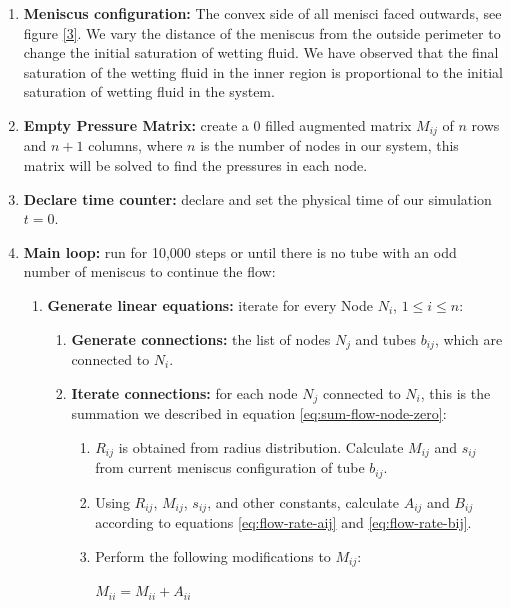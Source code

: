 \documentclass[
	12pt
] {article}
\begin{document}
\begin{enumerate}
	\item \textbf{Meniscus configuration:} The convex side of all menisci faced outwards, see figure \ref{3}. We vary the distance of the meniscus from the outside perimeter to change the initial saturation of wetting fluid. We have observed that the final saturation of the wetting fluid in the inner region is proportional to the initial saturation of wetting fluid in the system.
	
	\item \textbf{Empty Pressure Matrix:} create a 0 filled augmented matrix $M_{ij}$ of $n$ rows and $n + 1$ columns, where $n$ is the number of nodes in our system, this matrix will be solved to find the pressures in each node.
	
	\item \textbf{Declare time counter:} declare and set the physical time of our simulation $t = 0$.
	\item \textbf{Main loop:} run for 10,000 steps or until there is no tube with an odd number of meniscus to continue the flow:
	\begin{enumerate}
		\item \textbf{Generate linear equations:} iterate for every Node $N_i$, $1 \le i \le n$:
		
		\begin{enumerate}
			\item \textbf{Generate connections:} the list of nodes $N_j$ and tubes $b_{ij}$, which are connected to $N_i$.
			
			\item \textbf{Iterate connections:} for each node $N_j$ connected to $N_i$, this is the summation we described in equation \ref{eq:sum-flow-node-zero}:
			
			\begin{enumerate}
				\item $R_{ij}$ is obtained from radius distribution. Calculate $M_{ij}$ and $s_{ij}$ from current meniscus configuration of tube $b_{ij}$.
				
				\item Using $R_{ij}$, $M_{ij}$, $s_{ij}$, and other constants, calculate $A_{ij}$ and $B_{ij}$ according to equations \ref{eq:flow-rate-aij} and \ref{eq:flow-rate-bij}.
				
				\item Perform the following modifications to $M_{ij}$:
				
				$M_{ii} = M_{ii} + A_{ii}$
				

\end{enumerate}
\end{enumerate}
\end{enumerate}
\end{enumerate}
\end{document}
